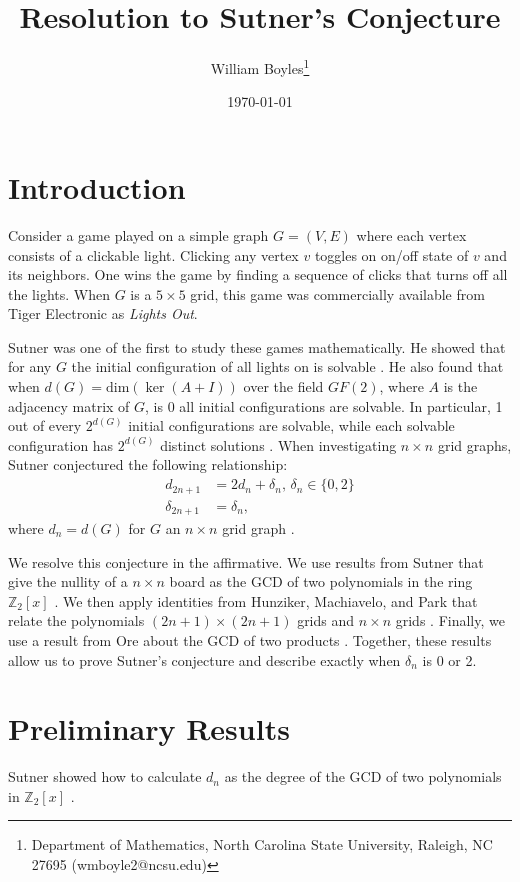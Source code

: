 \documentclass[a4paper]{article}
\newcommand{\Z}{\mathbb{Z}}
\renewcommand{\dim}[1]{\text{dim}\left( #1 \right)}
\begin{document}
	\title{Resolution to Sutner's Conjecture}
	\author{William Boyles\thanks{Department of Mathematics, North Carolina State University, Raleigh, NC 27695 (wmboyle2@ncsu.edu)}}
	\date{\today}
	\maketitle
	
	\section{Introduction}
	Consider a game played on a simple graph $G = (V,E)$ where each vertex consists of a clickable light.
	Clicking any vertex $v$ toggles on on/off state of $v$ and its neighbors.
	One wins the game by finding a sequence of clicks that turns off all the lights.
	When $G$ is a $5 \times 5$ grid, this game was commercially available from Tiger Electronic as \textit{Lights Out}.
	
	Sutner was one of the first to study these games mathematically.
	He showed that for any $G$ the initial configuration of all lights on is solvable \cite{Sutner1989}.
	He also found that when $d(G) = \dim{\ker{(A + I)}}$ over the field $GF(2)$, where $A$ is the adjacency matrix of $G$, is 0 all initial configurations are solvable.
	In particular, 1 out of every $2^{d(G)}$ initial configurations are solvable, while each solvable configuration has $2^{d(G)}$ distinct solutions \cite{Sutner1989}.
	When investigating $n \times n$ grid graphs, Sutner conjectured the following relationship:
	\begin{align*}
		d_{2n+1} &= 2d_n + \delta_n \text{, } \delta_n \in \{0,2\} \\
		\delta_{2n+1} &= \delta_n,
	\end{align*}
	where $d_n = d(G)$ for $G$ an $n \times n$ grid graph \cite{Sutner1989}.
	
	We resolve this conjecture in the affirmative.
	We use results from Sutner that give the nullity of a $n \times n$ board as the GCD of two polynomials in the ring $\Z_2[x]$ \cite{Sutner96sigma-automataand}.
	We then apply identities from Hunziker, Machiavelo, and Park that relate the polynomials $(2n+1) \times (2n+1)$ grids and $n \times n$ grids \cite{HUNZIKER2004465}.
	Finally, we use a result from Ore about the GCD of two products \cite{ore_number_theory}.
	Together, these results allow us to prove Sutner's conjecture and describe exactly when $\delta_n$ is 0 or 2.
	
	\section{Preliminary Results}
	Sutner showed how to calculate $d_n$ as the degree of the GCD of two polynomials in $\Z_2[x]$ \cite{Sutner96sigma-automataand}.
	
\end{document}
